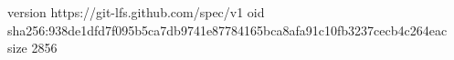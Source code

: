 version https://git-lfs.github.com/spec/v1
oid sha256:938de1dfd7f095b5ca7db9741e87784165bca8afa91c10fb3237cecb4c264eac
size 2856
